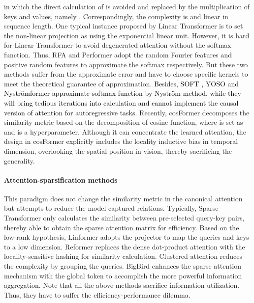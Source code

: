 \documentclass[nohyperref]{article}
\theoremstyle{plain}
\theoremstyle{definition}
\theoremstyle{remark}
\newcommand{\update}[1]{{\textcolor{black}{#1}}}
\begin{document}
in which the direct calculation of  is avoided and replaced by the multiplication of keys and values, namely . Correspondingly, the complexity is  and linear in sequence length. One typical instance proposed by Linear Transformer \cite{Katharopoulos2020TransformersAR} is to set the non-linear projection  as  using the exponential linear unit. However, it is hard for Linear Transformer to avoid degenerated attention without the softmax function. Thus, RFA \cite{Peng2021RandomFA} and Performer \cite{performer} adopt the random Fourier features \cite{Rahimi2007RandomFF} and positive random features to approximate the softmax respectively. But these two methods suffer from the approximate error and have to choose specific kernels to meet the theoretical guarantee of approximation. \update{Besides, SOFT \cite{Lu2021SOFTST}, YOSO \cite{zeng2021yoso} and Nystr{\"o}mformer \cite{Xiong2021NystrmformerAN} approximate softmax function by Nystr{\"o}m method, while they will bring tedious iterations into calculation and cannot implement the causal version of attention for autoregressive tasks.} Recently, cosFormer \cite{anonymous2022cosformer} decomposes the similarity metric based on the decomposition of cosine function, where  is set as  and  is a hyperparameter. Although it can concentrate the learned attention, the design in cosFormer explicitly includes the locality inductive bias in temporal dimension, overlooking the spatial position in vision, thereby sacrificing the generality.

\vspace{-10pt}
\paragraph{Attention-sparsification methods} 
This paradigm does not change the similarity metric  in the canonical attention but attempts to reduce the model captured relations. Typically, Sparse Transformer \cite{Child2019GeneratingLS} only calculates the similarity between pre-selected query-key pairs, thereby able to obtain the sparse attention matrix for efficiency. Based on the low-rank hypothesis, Linformer \cite{Wang2020LinformerSW} adopts the projector to map the queries and keys to a low dimension. Reformer \cite{kitaev2020reformer} replaces the dense dot-product attention with the locality-sensitive hashing for similarity calculation. Clustered attention \cite{Vyas2020FastTW} reduces the complexity by grouping the queries. BigBird \cite{Zaheer2020BigBT} enhances the sparse attention mechanism with the global token to accomplish the more powerful information aggregation. Note that all the above methods sacrifice information utilization. Thus, they have to suffer the efficiency-performance dilemma. 
\end{document}
